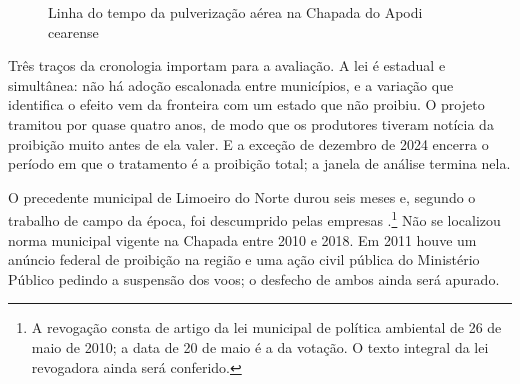 \begin{figure}[ht]
\centering
\caption{Linha do tempo da pulverização aérea na Chapada do Apodi cearense}
\label{fig:linha}
\end{figure}

Três traços da cronologia importam para a avaliação. A lei é estadual e
simultânea: não há adoção escalonada entre municípios, e a variação que
identifica o efeito vem da fronteira com um estado que não proibiu. O projeto
tramitou por quase quatro anos, de modo que os produtores tiveram notícia da
proibição muito antes de ela valer. E a exceção de dezembro de 2024 encerra o
período em que o tratamento é a proibição total; a janela de análise termina
nela.

O precedente municipal de Limoeiro do Norte durou seis meses e, segundo o
trabalho de campo da época, foi descumprido pelas empresas
\cite[p.~536--542]{teixeira2011rebulico}.\footnote{A revogação consta de artigo
da lei municipal de política ambiental de 26 de maio de 2010; a data de 20 de
maio é a da votação. O texto integral da lei revogadora ainda será conferido.}
Não se localizou norma municipal vigente na Chapada entre 2010 e 2018. Em 2011
houve um anúncio federal de proibição na região e uma ação civil pública do
Ministério Público pedindo a suspensão dos voos; o desfecho de ambos ainda será
apurado.

